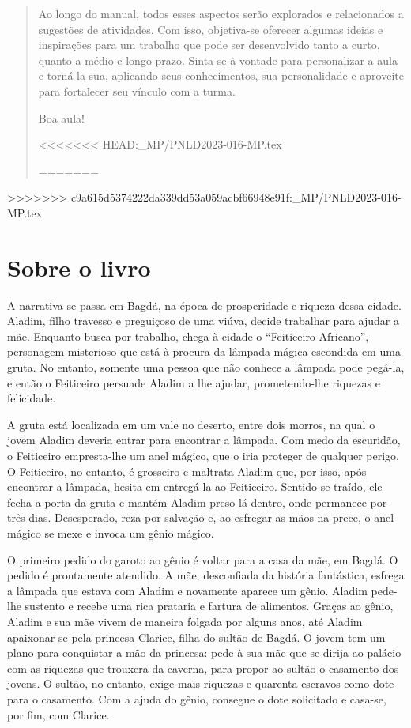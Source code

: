 \documentclass[11pt]{extarticle}
\begin{document}
\begin{abstract}

Ao longo do manual, todos esses aspectos serão explorados e relacionados a sugestões de atividades. Com isso, objetiva-se oferecer algumas ideias e inspirações para um trabalho que pode ser desenvolvido tanto a curto, quanto a médio e longo prazo. Sinta-se à vontade para personalizar a aula e torná-la sua, aplicando seus conhecimentos, sua 
personalidade e aproveite para fortalecer seu vínculo com a turma.

Boa aula!

<<<<<<< HEAD:_MP/PNLD2023-016-MP.tex

=======
\end{abstract}
>>>>>>> c9a615d5374222da339dd53a059acbf66948e91f:_MP/PNLD2023-016-MP.tex

\section{Sobre o livro}
A narrativa se passa em Bagdá, na época de prosperidade e riqueza dessa cidade.
Aladim, filho travesso e preguiçoso de uma viúva, decide trabalhar para ajudar a mãe.
Enquanto busca por trabalho, chega à cidade o “Feiticeiro Africano”, personagem misterioso que está à procura da lâmpada mágica escondida em uma gruta. No entanto, somente uma pessoa que não conhece a lâmpada pode pegá-la, e então o Feiticeiro persuade Aladim a lhe ajudar, prometendo-lhe riquezas e felicidade.

A gruta está localizada em um vale no deserto, entre dois morros, na qual o jovem Aladim deveria entrar para encontrar a lâmpada. Com medo da escuridão, o Feiticeiro empresta-lhe um anel mágico, que o iria proteger de qualquer perigo. O Feiticeiro, no entanto, é grosseiro e maltrata Aladim que, por isso, após encontrar a lâmpada, hesita em entregá-la ao Feiticeiro. Sentido-se traído, ele fecha a porta da gruta e mantém Aladim preso lá dentro, onde permanece por três dias. Desesperado, reza por salvação e, ao esfregar as mãos na prece, o anel mágico se mexe e invoca um gênio mágico.

O primeiro pedido do garoto ao gênio é voltar para a casa da mãe, em Bagdá. O pedido é prontamente atendido. A mãe, desconfiada da história fantástica, esfrega a lâmpada que estava com Aladim e novamente aparece um gênio. Aladim pede-lhe sustento e recebe uma rica prataria e fartura de alimentos. Graças ao gênio, Aladim e sua mãe vivem de maneira folgada por alguns anos, até Aladim apaixonar-se pela princesa Clarice, filha do sultão de Bagdá. O jovem tem um plano para conquistar a mão da princesa: pede à sua mãe que se dirija ao palácio com as riquezas que trouxera da caverna, para propor ao sultão o casamento dos jovens. O sultão, no entanto, exige mais riquezas e quarenta escravos como dote para o casamento. Com a ajuda do gênio, consegue o dote solicitado e casa-se, por fim, com Clarice.
\end{document}

